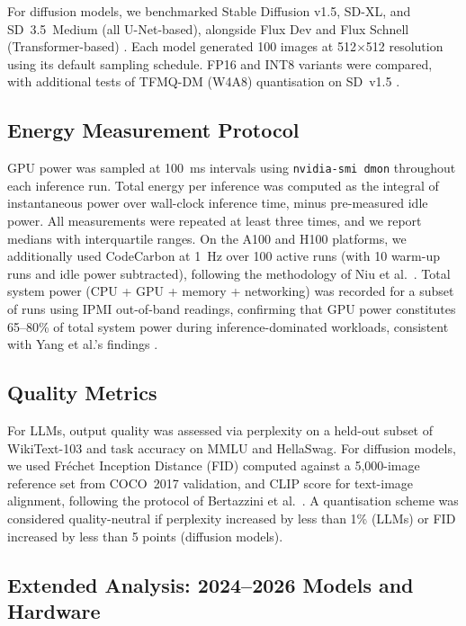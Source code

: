 \documentclass[AMS,STIX2COL]{WileyNJD-v2}
\begin{document}
For diffusion models, we benchmarked Stable Diffusion v1.5, SD-XL, and SD~3.5~Medium (all U-Net-based), alongside Flux Dev and Flux Schnell (Transformer-based) \cite{rombach2022ldm, bfl2024flux}. Each model generated 100 images at 512$\times$512 resolution using its default sampling schedule. FP16 and INT8 variants were compared, with additional tests of TFMQ-DM (W4A8) quantisation on SD~v1.5 \cite{huang2024tfmqdm}.

\subsection{Energy Measurement Protocol}

GPU power was sampled at 100~ms intervals using \texttt{nvidia-smi dmon} throughout each inference run. Total energy per inference was computed as the integral of instantaneous power over wall-clock inference time, minus pre-measured idle power. All measurements were repeated at least three times, and we report medians with interquartile ranges. On the A100 and H100 platforms, we additionally used CodeCarbon at 1~Hz over 100 active runs (with 10 warm-up runs and idle power subtracted), following the methodology of Niu et al.\ \cite{niu2025tokenpowerbench}. Total system power (CPU + GPU + memory + networking) was recorded for a subset of runs using IPMI out-of-band readings, confirming that GPU power constitutes 65--80\% of total system power during inference-dominated workloads, consistent with Yang et al.'s findings \cite{yang2025system}.

\subsection{Quality Metrics}

For LLMs, output quality was assessed via perplexity on a held-out subset of WikiText-103 and task accuracy on MMLU and HellaSwag. For diffusion models, we used Fr\'{e}chet Inception Distance (FID) computed against a 5,000-image reference set from COCO~2017 validation, and CLIP score for text-image alignment, following the protocol of Bertazzini et al.\ \cite{bertazzini2025hidden}. A quantisation scheme was considered quality-neutral if perplexity increased by less than 1\% (LLMs) or FID increased by less than 5 points (diffusion models).

\subsection{Extended Analysis: 2024--2026 Models and Hardware}
\end{document}
